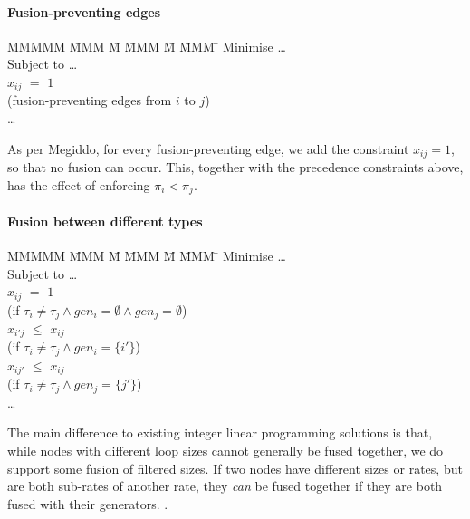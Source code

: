 \paragraph{Fusion-preventing edges}
\begin{tabbing}
MMMMM   \= MMM \= M \= MMM \= M \= MMM \= \kill
Minimise   \> \ldots \\
Subject to \> \ldots \\
           \> $x_{ij}$    \> $=$   \> $1$             \>       \>            \\
           \> (fusion-preventing edges from $i$ to $j$)      \\
           \> \ldots
\end{tabbing}
As per Megiddo\cite{megiddo1998optimal}, for every fusion-preventing edge, we add the constraint $x_{ij} = 1$, so that no fusion can occur.
This, together with the precedence constraints above, has the effect of enforcing $\pi_i < \pi_j$.


\paragraph{Fusion between different types}
\begin{tabbing}
MMMMM   \= MMM \= M \= MMM \= M \= MMM \= \kill
Minimise   \> \ldots \\
Subject to \> \ldots \\
           \> $x_{ij}$    \> $=$   \> $1$             \>       \>            \\
           \> (if $\tau_i \not= \tau_j \wedge gen_i=\emptyset \wedge gen_j=\emptyset$)                 \\
           \> $x_{i'j}$   \> $\le$ \> $x_{ij}$        \>       \>            \\
           \> (if $\tau_i \not= \tau_j \wedge gen_i=\{i'\}$) \\
           \> $x_{ij'}$   \> $\le$ \> $x_{ij}$        \>       \>            \\
           \> (if $\tau_i \not= \tau_j \wedge gen_j=\{j'\}$) \\
           \> \ldots
\end{tabbing}
The main difference to existing integer linear programming solutions is that, while nodes with different loop sizes cannot generally be fused together, we do support some fusion of filtered sizes.
If two nodes have different sizes or rates, but are both sub-rates of another rate, they \emph{can} be fused together if they are both fused with their generators.
.

